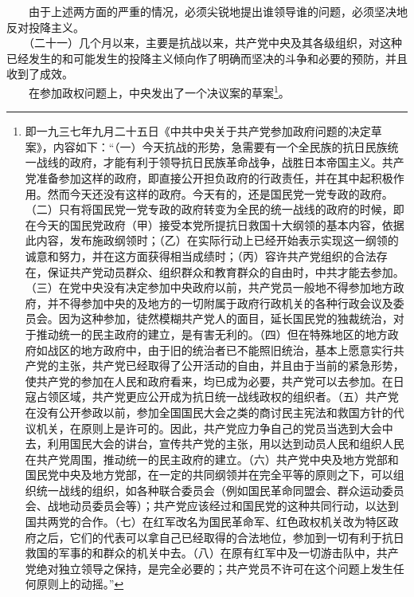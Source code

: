 \documentclass[cn,11pt,chinese]{elegantbook}
\begin{document}
　　由于上述两方面的严重的情况，必须尖锐地提出谁领导谁的问题，必须坚决地反对投降主义。\\
　　（二十一）几个月以来，主要是抗战以来，共产党中央及其各级组织，对这种已经发生的和可能发生的投降主义倾向作了明确而坚决的斗争和必要的预防，并且收到了成效。\\
　　在参加政权问题上，中央发出了一个决议案的草案\footnote[9]{ 即一九三七年九月二十五日《中共中央关于共产党参加政府问题的决定草案》，内容如下：“（一）今天抗战的形势，急需要有一个全民族的抗日民族统一战线的政府，才能有利于领导抗日民族革命战争，战胜日本帝国主义。共产党准备参加这样的政府，即直接公开担负政府的行政责任，并在其中起积极作用。然而今天还没有这样的政府。今天有的，还是国民党一党专政的政府。（二）只有将国民党一党专政的政府转变为全民的统一战线的政府的时候，即在今天的国民党政府（甲）接受本党所提抗日救国十大纲领的基本内容，依据此内容，发布施政纲领时；（乙）在实际行动上已经开始表示实现这一纲领的诚意和努力，并在这方面获得相当成绩时；（丙）容许共产党组织的合法存在，保证共产党动员群众、组织群众和教育群众的自由时，中共才能去参加。（三）在党中央没有决定参加中央政府以前，共产党员一般地不得参加地方政府，并不得参加中央的及地方的一切附属于政府行政机关的各种行政会议及委员会。因为这种参加，徒然模糊共产党人的面目，延长国民党的独裁统治，对于推动统一的民主政府的建立，是有害无利的。（四）但在特殊地区的地方政府如战区的地方政府中，由于旧的统治者已不能照旧统治，基本上愿意实行共产党的主张，共产党已经取得了公开活动的自由，并且由于当前的紧急形势，使共产党的参加在人民和政府看来，均已成为必要，共产党可以去参加。在日寇占领区域，共产党更应公开成为抗日统一战线政权的组织者。（五）共产党在没有公开参政以前，参加全国国民大会之类的商讨民主宪法和救国方针的代议机关，在原则上是许可的。因此，共产党应力争自己的党员当选到大会中去，利用国民大会的讲台，宣传共产党的主张，用以达到动员人民和组织人民在共产党周围，推动统一的民主政府的建立。（六）共产党中央及地方党部和国民党中央及地方党部，在一定的共同纲领并在完全平等的原则之下，可以组织统一战线的组织，如各种联合委员会（例如国民革命同盟会、群众运动委员会、战地动员委员会等）；共产党应该经过和国民党的这种共同行动，以达到国共两党的合作。（七）在红军改名为国民革命军、红色政权机关改为特区政府之后，它们的代表可以拿自己已经取得的合法地位，参加到一切有利于抗日救国的军事的和群众的机关中去。（八）在原有红军中及一切游击队中，共产党绝对独立领导之保持，是完全必要的；共产党员不许可在这个问题上发生任何原则上的动摇。”}。\\
\end{document}
